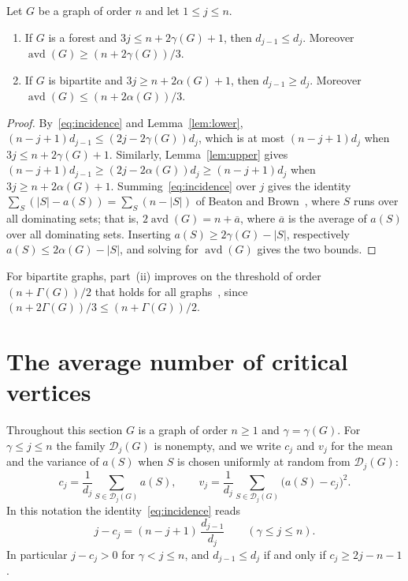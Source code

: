\documentclass[smallextended,envcountsect,envcountsame]{svjour3}
\newcommand{\Dom}{\mathcal{D}}
\begin{document}
\begin{corollary}\label{cor:segments}
Let $G$ be a graph of order $n$ and let $1\le j\le n$.
\begin{enumerate}
\item[\textup{(i)}] If $G$ is a forest and $3j\le n+2\gamma(G)+1$, then
$d_{j-1}\le d_j$. Moreover $\operatorname{avd}(G)\ge(n+2\gamma(G))/3$.
\item[\textup{(ii)}] If $G$ is bipartite and $3j\ge n+2\alpha(G)+1$, then
$d_{j-1}\ge d_j$. Moreover $\operatorname{avd}(G)\le(n+2\alpha(G))/3$.
\end{enumerate}
\end{corollary}

\begin{proof}
By~\eqref{eq:incidence} and Lemma~\ref{lem:lower},
$(n-j+1)d_{j-1}\le(2j-2\gamma(G))d_j$, which is at most $(n-j+1)d_j$ when
$3j\le n+2\gamma(G)+1$. Similarly, Lemma~\ref{lem:upper} gives
$(n-j+1)d_{j-1}\ge(2j-2\alpha(G))d_j\ge(n-j+1)d_j$ when
$3j\ge n+2\alpha(G)+1$. Summing~\eqref{eq:incidence} over $j$ gives the
identity $\sum_S(|S|-a(S))=\sum_S(n-|S|)$ of Beaton and Brown~\cite{BB21},
where $S$ runs over all dominating sets; that is,
$2\operatorname{avd}(G)=n+\overline{a}$, where $\overline a$ is the average of
$a(S)$ over all dominating sets. Inserting $a(S)\ge2\gamma(G)-|S|$,
respectively $a(S)\le2\alpha(G)-|S|$, and solving for
$\operatorname{avd}(G)$ gives the two bounds.
\end{proof}

For bipartite graphs, part~(ii) improves on the threshold of order
$(n+\Gamma(G))/2$ that holds for all graphs~\cite{BO}, since
$(n+2\Gamma(G))/3\le(n+\Gamma(G))/2$.

\section{The average number of critical vertices}\label{sec:jump}

Throughout this section $G$ is a graph of order $n\ge1$ and
$\gamma=\gamma(G)$. For $\gamma\le j\le n$ the family $\Dom_j(G)$ is
nonempty, and we write $c_j$ and $v_j$ for the mean and the variance of
$a(S)$ when $S$ is chosen uniformly at random from $\Dom_j(G)$:
\begingroup\small\[
  c_j=\frac1{d_j}\sum_{S\in\Dom_j(G)}a(S),\qquad
  v_j=\frac1{d_j}\sum_{S\in\Dom_j(G)}\bigl(a(S)-c_j\bigr)^2 .
\]\endgroup
In this notation the identity~\eqref{eq:incidence} reads
\begingroup\small\begin{equation}\label{eq:mean}
  j-c_j=(n-j+1)\,\frac{d_{j-1}}{d_j}\qquad(\gamma\le j\le n).
\end{equation}\endgroup
In particular $j-c_j>0$ for $\gamma<j\le n$, and $d_{j-1}\le d_j$ if and only
if $c_j\ge 2j-n-1$.
\end{document}
